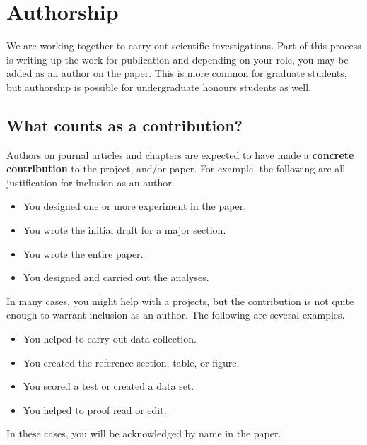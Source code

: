 \documentclass{article}
\begin{document}
\section{Authorship}
We are working together to carry out scientific investigations. Part of this process is writing up the work for publication and depending on your role, you may be added as an author on the paper. This is more common for graduate students, but authorship is possible for undergraduate honours students as well. 

\subsection{What counts as a contribution?}
Authors on journal articles and chapters are expected to have made a \textbf{concrete contribution} to the project, and/or paper. For example, the following are all justification for inclusion as an author.
\begin{itemize}
\item You designed one or more experiment in the paper.
\item You wrote the initial draft for a major section.
\item You wrote the entire paper.
\item You designed and carried out the analyses.
\end{itemize}

In many cases, you might help with a projects, but the contribution is not quite enough to warrant inclusion as an author. The following are several examples.
\begin{itemize}
\item You helped to carry out data collection.
\item You created the reference section, table, or figure.
\item You scored a test or created a data set.
\item You helped to proof read or edit.
\end{itemize}
In these cases, you will be acknowledged by name in the paper.
\end{document}
